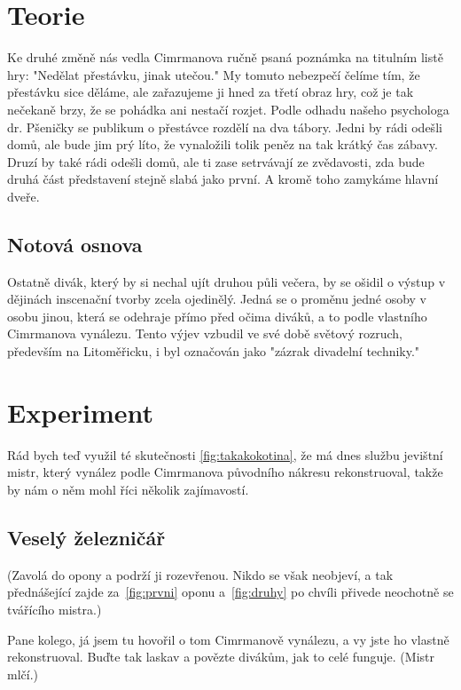 \documentclass{cygclanek}
\begin{document}
\section{Teorie}
Ke druhé změně nás vedla Cimrmanova ručně psaná poznámka na titulním listě hry: "Nedělat přestávku, jinak utečou." My tomuto nebezpečí čelíme tím, že přestávku sice děláme, ale zařazujeme ji hned za třetí obraz hry, což je tak nečekaně brzy, že se pohádka ani nestačí rozjet. Podle odhadu našeho psychologa dr. Pšeničky se publikum o přestávce rozdělí na dva tábory. Jedni by rádi odešli domů, ale bude jim prý líto, že vynaložili tolik peněz na tak krátký čas zábavy. Druzí by také rádi odešli domů, ale ti zase setrvávají ze zvědavosti, zda bude druhá část představení stejně slabá jako první. A kromě toho zamykáme hlavní dveře.


\subsection{Notová osnova}
Ostatně divák, který by si nechal ujít druhou půli večera, by se ošidil o výstup v dějinách inscenační tvorby zcela ojedinělý. Jedná se o proměnu jedné osoby v osobu jinou, která se odehraje přímo před očima diváků, a to podle vlastního Cimrmanova vynálezu. Tento výjev vzbudil ve své době světový rozruch, především na Litoměřicku, i byl označován jako "zázrak divadelní techniky."


\section{Experiment}
Rád bych teď využil té skutečnosti \ref{fig:takakokotina}, že má dnes službu jevištní mistr, který vynález podle Cimrmanova původního nákresu rekonstruoval, takže by nám o něm mohl říci několik zajímavostí. 

\subsection{Veselý železničář}
(Zavolá do opony a podrží ji rozevřenou. Nikdo se však neobjeví, a tak přednášející zajde za~\ref{fig:prvni} oponu a~\ref{fig:druhy} po chvíli přivede neochotně se tvářícího mistra.)

Pane kolego, já jsem tu hovořil o tom Cimrmanově vynálezu, a vy jste ho vlastně rekonstruoval. Buďte tak laskav a povězte divákům, jak to celé funguje. (Mistr mlčí.)
\end{document}
